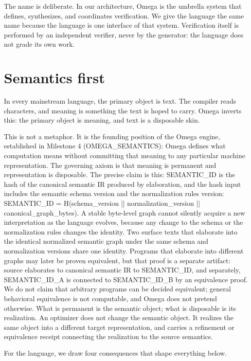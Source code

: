 \documentclass[11pt]{article}
\begin{document}
The name is deliberate. In our architecture, Omega is the umbrella system
that defines, synthesizes, and coordinates verification. We give the
language the same name because the language is one interface of that
system. Verification itself is performed by an independent verifier,
never by the generator: the language does not grade its own work.

\section{Semantics first}
\label{sec:semantics}

In every mainstream language, the primary object is text. The compiler
reads characters, and meaning is something the text is hoped to carry.
Omega inverts this: the primary object is meaning, and text is a
disposable skin.

This is not a metaphor. It is the founding position of the Omega engine,
established in Milestone 4 (OMEGA\_SEMANTICS): Omega defines what
computation means without committing that meaning to any particular
machine representation. The governing axiom is that meaning is permanent
and representation is disposable. The precise claim is this: SEMANTIC\_ID is the hash of the canonical
semantic IR produced by elaboration, and the hash input includes the
semantic schema version and the normalization rules version:
SEMANTIC\_ID = H(schema\_version || normalization\_version ||
canonical\_graph\_bytes). A stable byte-level graph cannot silently
acquire a new interpretation as the language evolves, because any change
to the schema or the normalization rules changes the identity. Two
surface texts that elaborate into the identical normalized semantic graph
under the same schema and normalization versions share one identity. Programs that elaborate into different
graphs may later be proven equivalent, but that proof is a separate
artifact: source elaborates to canonical semantic IR to SEMANTIC\_ID, and
separately, SEMANTIC\_ID\_A is connected to SEMANTIC\_ID\_B by an
equivalence proof. We do not claim that arbitrary programs can be decided
equivalent; general behavioral equivalence is not computable, and Omega
does not pretend otherwise. What is permanent is the semantic object; what
is disposable is its realization. An optimizer does not change the semantic
object. It realizes the same object into a different target representation,
and carries a refinement or equivalence receipt connecting the realization
to the source semantics.

For the language, we draw four consequences that shape everything below.
\end{document}
